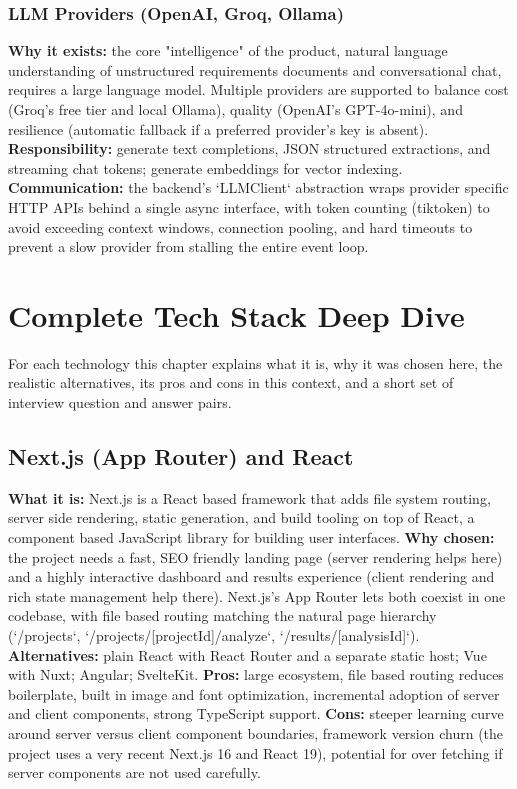 \documentclass[11pt,a4paper]{report}
\begin{document}
\subsection{LLM Providers (OpenAI, Groq, Ollama)}
\textbf{Why it exists:} the core "intelligence" of the product, natural language understanding of unstructured requirements documents and conversational chat, requires a large language model. Multiple providers are supported to balance cost (Groq's free tier and local Ollama), quality (OpenAI's GPT-4o-mini), and resilience (automatic fallback if a preferred provider's key is absent).
\textbf{Responsibility:} generate text completions, JSON structured extractions, and streaming chat tokens; generate embeddings for vector indexing.
\textbf{Communication:} the backend's `LLMClient` abstraction wraps provider specific HTTP APIs behind a single async interface, with token counting (tiktoken) to avoid exceeding context windows, connection pooling, and hard timeouts to prevent a slow provider from stalling the entire event loop.

\chapter{Complete Tech Stack Deep Dive}

For each technology this chapter explains what it is, why it was chosen here, the realistic alternatives, its pros and cons in this context, and a short set of interview question and answer pairs.

\section{Next.js (App Router) and React}
\textbf{What it is:} Next.js is a React based framework that adds file system routing, server side rendering, static generation, and build tooling on top of React, a component based JavaScript library for building user interfaces.
\textbf{Why chosen:} the project needs a fast, SEO friendly landing page (server rendering helps here) and a highly interactive dashboard and results experience (client rendering and rich state management help there). Next.js's App Router lets both coexist in one codebase, with file based routing matching the natural page hierarchy (`/projects`, `/projects/[projectId]/analyze`, `/results/[analysisId]`).
\textbf{Alternatives:} plain React with React Router and a separate static host; Vue with Nuxt; Angular; SvelteKit.
\textbf{Pros:} large ecosystem, file based routing reduces boilerplate, built in image and font optimization, incremental adoption of server and client components, strong TypeScript support.
\textbf{Cons:} steeper learning curve around server versus client component boundaries, framework version churn (the project uses a very recent Next.js 16 and React 19), potential for over fetching if server components are not used carefully.
\end{document}
